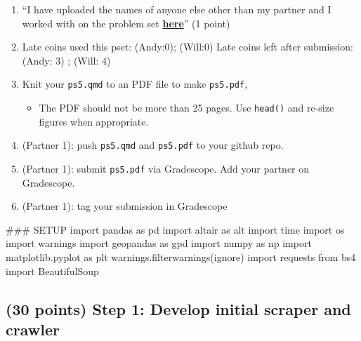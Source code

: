 \documentclass[
  letterpaper,
  DIV=11,
  numbers=noendperiod]{scrartcl}
\newenvironment{Shaded}{\begin{snugshade}}{\end{snugshade}}
\newcommand{\CommentTok}[1]{\textcolor[rgb]{0.37,0.37,0.37}{#1}}
\newcommand{\ImportTok}[1]{\textcolor[rgb]{0.00,0.46,0.62}{#1}}
\newcommand{\NormalTok}[1]{\textcolor[rgb]{0.00,0.23,0.31}{#1}}
\newcommand{\StringTok}[1]{\textcolor[rgb]{0.13,0.47,0.30}{#1}}
\providecommand{\tightlist}{%
  \setlength{\itemsep}{0pt}\setlength{\parskip}{0pt}}\usepackage{longtable,booktabs,array}
\begin{document}
\begin{enumerate}
\def\labelenumi{\arabic{enumi}.}
\setcounter{enumi}{4}
\tightlist
\item
  ``I have uploaded the names of anyone else other than my partner and I
  worked with on the problem set
  \textbf{\href{https://docs.google.com/forms/d/185usrCREQaUbvAXpWhChkjghdGgmAZXA3lPWpXLLsts/edit}{here}}''
  (1 point)
\item
  Late coins used this pset: (Andy:0); (Will:0) Late coins left after
  submission: (Andy: 3) ; (Will: 4)
\item
  Knit your \texttt{ps5.qmd} to an PDF file to make \texttt{ps5.pdf},

  \begin{itemize}
  \tightlist
  \item
    The PDF should not be more than 25 pages. Use \texttt{head()} and
    re-size figures when appropriate.
  \end{itemize}
\item
  (Partner 1): push \texttt{ps5.qmd} and \texttt{ps5.pdf} to your github
  repo.
\item
  (Partner 1): submit \texttt{ps5.pdf} via Gradescope. Add your partner
  on Gradescope.
\item
  (Partner 1): tag your submission in Gradescope
\end{enumerate}

\begin{Shaded}
\begin{Highlighting}[]
\CommentTok{\#\#\# SETUP }
\ImportTok{import}\NormalTok{ pandas }\ImportTok{as}\NormalTok{ pd}
\ImportTok{import}\NormalTok{ altair }\ImportTok{as}\NormalTok{ alt}
\ImportTok{import}\NormalTok{ time}
\ImportTok{import}\NormalTok{ os}
\ImportTok{import}\NormalTok{ warnings}
\ImportTok{import}\NormalTok{ geopandas }\ImportTok{as}\NormalTok{ gpd}
\ImportTok{import}\NormalTok{ numpy }\ImportTok{as}\NormalTok{ np}
\ImportTok{import}\NormalTok{ matplotlib.pyplot }\ImportTok{as}\NormalTok{ plt}
\NormalTok{warnings.filterwarnings(}\StringTok{\textquotesingle{}ignore\textquotesingle{}}\NormalTok{)}
\ImportTok{import}\NormalTok{ requests}
\ImportTok{from}\NormalTok{ bs4 }\ImportTok{import}\NormalTok{ BeautifulSoup}
\end{Highlighting}
\end{Shaded}

\subsection{(30 points) Step 1: Develop initial scraper and
crawler}\label{points-step-1-develop-initial-scraper-and-crawler}
\end{document}
